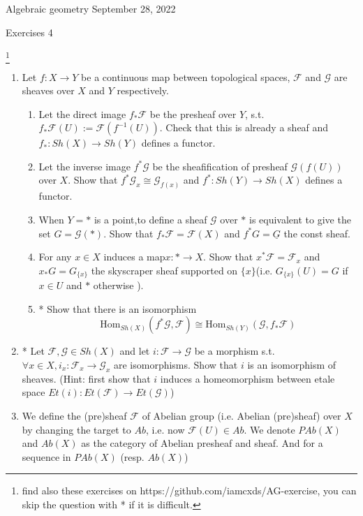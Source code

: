 \documentclass[a4paper,11pt]{article}
\def\Hom{\mathrm{Hom}}
\begin{document}
{\small Algebraic geometry \hfill September 28, 2022 \\}
\begin{center}
\Huge Exercises 4
\end{center}

\vskip0.6cm
\footnote{find also these exercises on https://github.com/iamcxds/AG-exercise, you can skip the question with * if it is difficult.}

\begin{enumerate}[1.]
\item Let $f: X\to Y$ be a continuous map between topological spaces, $\mathcal{F}$ and $\mathcal{G}$ are sheaves over $X$ and $Y$ respectively.
\begin{enumerate}
    \item Let the direct image $f_* \mathcal{F}$ be the presheaf over $Y$, s.t. $f_* \mathcal{F}(U):=\mathcal{F}(f^{-1}(U))$. Check that this is already a sheaf and $f_*: Sh(X)\to Sh(Y)$ defines a functor.
    \item Let the inverse image $f^*\mathcal{G}$ be the sheafification of presheaf $\mathcal{G}(f(U))$ over $X$. Show that $f^*\mathcal{G}_x\cong \mathcal{G}_{f(x)} $ and $f^*: Sh(Y)\to Sh(X)$ defines a functor.
    \item When $Y=*$ is a point,to define a sheaf $\mathcal{G}$ over $*$ is equivalent to give the set $G=\mathcal{G}(*)$. Show that $f_* \mathcal{F}=\mathcal{F}(X)$ and $f^*G=\underline{G} $ the const sheaf.
    \item For any $x\in X$ induces a map$x: *\to X$. Show that $x^* \mathcal{F}=\mathcal{F}_x$ and $x_*G= G_{\{x\}} $ the skyscraper sheaf supported on $\{x\}$(i.e. $G_{\{x\}}(U)=G$ if $x\in U$ and $*$ otherwise ).
    \item* Show that there is an isomorphism 
    \[ \Hom_{Sh(X)}(f^*\mathcal{G},\mathcal{F})\cong \Hom_{Sh(Y)}(\mathcal{G},f_*\mathcal{F})\]
\end{enumerate}
\item* Let $\mathcal{F},\mathcal{G}\in Sh(X)$ and let $i:\mathcal{F}\to\mathcal{G} $ be a morphism s.t. $ \forall x\in X, i_x:\mathcal{F}_x\to\mathcal{G}_x$ are isomorphisms. Show that $i$ is an isomorphism of sheaves. (Hint: first show that $i$ induces a homeomorphism between etale space $Et(i):Et(\mathcal{F})\to Et(\mathcal{G})$)
\item We define the (pre)sheaf $\mathcal{F}$ of Abelian group (i.e. Abelian (pre)sheaf) over $X$ by changing the target to $Ab$, i.e. now $\mathcal{F}(U)\in Ab$. We denote $PAb(X)$ and $Ab(X)$ as the category of Abelian presheaf and sheaf. And for a sequence in $PAb(X)$ (resp. $Ab(X)$) 

\end{enumerate}
\end{document}
